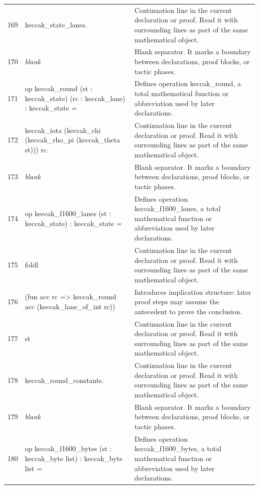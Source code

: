 \documentclass[10pt]{article}
\begin{document}
\begin{longtable}{r L{0.53\textwidth} L{0.37\textwidth}}
169 & {\ttfamily\scriptsize     keccak\_state\_lanes.} & Continuation line in the current declaration or proof.  Read it with surrounding lines as part of the same mathematical object. \\
170 & {\ttfamily\scriptsize \emph{blank}} & Blank separator.  It marks a boundary between declarations, proof blocks, or tactic phases. \\
171 & {\ttfamily\scriptsize op keccak\_round (st : keccak\_state) (rc : keccak\_lane) : keccak\_state =} & Defines operation keccak\_round, a total mathematical function or abbreviation used by later declarations. \\
172 & {\ttfamily\scriptsize   keccak\_iota (keccak\_chi (keccak\_rho\_pi (keccak\_theta st))) rc.} & Continuation line in the current declaration or proof.  Read it with surrounding lines as part of the same mathematical object. \\
173 & {\ttfamily\scriptsize \emph{blank}} & Blank separator.  It marks a boundary between declarations, proof blocks, or tactic phases. \\
174 & {\ttfamily\scriptsize op keccak\_f1600\_lanes (st : keccak\_state) : keccak\_state =} & Defines operation keccak\_f1600\_lanes, a total mathematical function or abbreviation used by later declarations. \\
175 & {\ttfamily\scriptsize   foldl} & Continuation line in the current declaration or proof.  Read it with surrounding lines as part of the same mathematical object. \\
176 & {\ttfamily\scriptsize     (fun acc rc => keccak\_round acc (keccak\_lane\_of\_int rc))} & Introduces implication structure: later proof steps may assume the antecedent to prove the conclusion. \\
177 & {\ttfamily\scriptsize     st} & Continuation line in the current declaration or proof.  Read it with surrounding lines as part of the same mathematical object. \\
178 & {\ttfamily\scriptsize     keccak\_round\_constants.} & Continuation line in the current declaration or proof.  Read it with surrounding lines as part of the same mathematical object. \\
179 & {\ttfamily\scriptsize \emph{blank}} & Blank separator.  It marks a boundary between declarations, proof blocks, or tactic phases. \\
180 & {\ttfamily\scriptsize op keccak\_f1600\_bytes (st : keccak\_byte list) : keccak\_byte list =} & Defines operation keccak\_f1600\_bytes, a total mathematical function or abbreviation used by later declarations. \\

\end{longtable}
\end{document}
